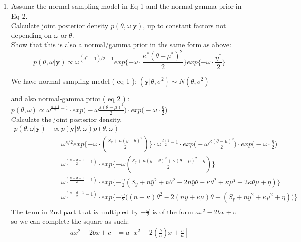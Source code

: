 \documentclass{homework}
\begin{document}
\begin{enumerate}[label=(\Alph*)]
\item  Assume the normal sampling model in Eq 1 and the normal-gamma prior in Eq 2. \\
Calculate joint posterior density $p(\theta, \omega | \textbf{y})$, up to constant factors not depending on $\omega$ or $\theta$. \\Show that this is also a normal/gamma prior in the same form as above:
$$ p(\theta, \omega | \textbf{y}) \propto \omega^{(d^*+1)/2 - 1}exp\{ -\omega \cdot \frac{\kappa^*(\theta - \mu^*)^2}{2}\}exp\{-\omega \cdot \frac{\eta^*}{2}\}$$
\par  We have normal sampling model ( eq 1 ):  $(\textbf{y} | \theta,\sigma^2) \sim N(\theta,\sigma^2)  $
\par  and also normal-gamma prior ( eq 2 ) :  $p(\theta, \omega) \propto \omega^{\frac{d+1}{2} - 1 } \cdot exp\big( -\omega \frac{\kappa(\theta - \mu)^2}{2} \big) \cdot exp\big( -\omega \cdot \frac{\eta}{2}\big) $\\ 
Calculate the joint posterior density, 
\begin{equation} \begin{split}
p( \theta, \omega | \textbf{y}) & \propto p( \textbf{y} | \theta, \omega) p(\theta, \omega) \\ 
& = \omega^{n/2}exp\{ -\omega \cdot ( \frac{S_y + n(\bar{y} - \theta)^2}{2} ) \}  \cdot \omega^{\frac{d+1}{2} - 1 } \cdot exp\big( -\omega \frac{\kappa(\theta - \mu)^2}{2} \big) \cdot exp\big( -\omega \cdot \frac{\eta}{2}\big) \\
& = \omega^{( \frac{n + d + 1}{2} - 1)} \cdot exp\{ -\omega ( \frac{S_y + n(\bar{y} - \theta)^2 + \kappa(\theta - \mu)^2 + \eta}{2}) \} \\
& =  \omega^{( \frac{n + d + 1}{2} - 1)} \cdot exp\{ -\frac{\omega}{2} ( S_y + n\bar{y}^2 + n\theta^2 - 2n\bar{y}\theta + \kappa\theta^2 + \kappa\mu^2 - 2\kappa\theta\mu + \eta ) \} \\
& =  \omega^{( \frac{n + d + 1}{2} - 1)} \cdot exp\{ -\frac{\omega}{2} \big( (n+\kappa)\theta^2 - 2(n\bar{y} + \kappa\mu)\theta + ( S_y + n\bar{y}^2 + \kappa\mu^2 + \eta) \big)\} \\
\end{split} \end{equation}
The term in 2nd part that is multipled by $-\frac{\omega}{2}$ is of the form $ax^2 -2bx + c$ \\so we can complete the square as such:
\begin{equation} \begin{split}
ax^2 -2bx + c & = a [ x^2 - 2(\frac{b}{a})x + \frac{c}{a} ] \\

\end{split}
\end{equation}
\end{enumerate}
\end{document}
